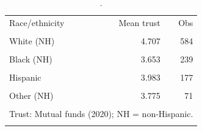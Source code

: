 \begin{table}[htbp]\centering
\caption{.}
\label{tab:trust_mean_by_race_eth_mutual_funds_2020}
\begin{tabular}{lrr}\toprule
Race/ethnicity & Mean trust & Obs \\\\ \midrule
White (NH) & 4.707 & 584 \\\\
Black (NH) & 3.653 & 239 \\\\
Hispanic & 3.983 & 177 \\\\
Other (NH) & 3.775 & 71 \\\\
\bottomrule
\multicolumn{3}{l}{\footnotesize Trust: Mutual funds (2020); NH = non-Hispanic.} \\\\
\end{tabular}
\end{table}
